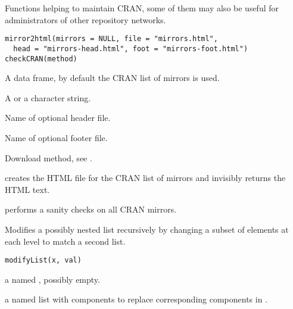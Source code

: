 %
\begin{Description}\relax
Functions helping to maintain CRAN, some of them may also be useful
for administrators of other repository networks.
\end{Description}
%
\begin{Usage}
\begin{verbatim}
mirror2html(mirrors = NULL, file = "mirrors.html",
  head = "mirrors-head.html", foot = "mirrors-foot.html")
checkCRAN(method)
\end{verbatim}
\end{Usage}
%
\begin{Arguments}
\begin{ldescription}
\item[\code{mirrors}] A data frame, by default the CRAN list of mirrors is used.
\item[\code{file}] A  or a character string.
\item[\code{head}] Name of optional header file.
\item[\code{foot}] Name of optional footer file.
\item[\code{method}] Download method, see .
\end{ldescription}
\end{Arguments}
%
\begin{Details}\relax
{} creates the HTML file for the CRAN list of mirrors
and invisibly returns the HTML text.

 performs a sanity checks on all CRAN mirrors.
\end{Details}
%
\begin{Description}\relax
Modifies a possibly nested list recursively by changing a subset of
elements at each level to match a second list.
\end{Description}
%
\begin{Usage}
\begin{verbatim}
modifyList(x, val)
\end{verbatim}
\end{Usage}
%
\begin{Arguments}
\begin{ldescription}
\item[\code{x}] a named , possibly empty.
\item[\code{val}] a named list with components to replace corresponding
components in .
\end{ldescription}
\end{Arguments}
